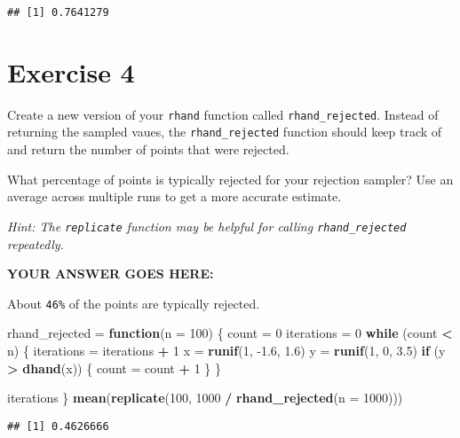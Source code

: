 \documentclass[
]{article}
\newenvironment{Shaded}{\begin{snugshade}}{\end{snugshade}}
\newcommand{\ControlFlowTok}[1]{\textcolor[rgb]{0.13,0.29,0.53}{\textbf{#1}}}
\newcommand{\DataTypeTok}[1]{\textcolor[rgb]{0.13,0.29,0.53}{#1}}
\newcommand{\DecValTok}[1]{\textcolor[rgb]{0.00,0.00,0.81}{#1}}
\newcommand{\FloatTok}[1]{\textcolor[rgb]{0.00,0.00,0.81}{#1}}
\newcommand{\KeywordTok}[1]{\textcolor[rgb]{0.13,0.29,0.53}{\textbf{#1}}}
\newcommand{\NormalTok}[1]{#1}
\newcommand{\OperatorTok}[1]{\textcolor[rgb]{0.81,0.36,0.00}{\textbf{#1}}}
\newcommand{\StringTok}[1]{\textcolor[rgb]{0.31,0.60,0.02}{#1}}
\begin{document}
\begin{verbatim}
## [1] 0.7641279
\end{verbatim}

\hypertarget{exercise-4}{%
\section{Exercise 4}\label{exercise-4}}

Create a new version of your \texttt{rhand} function called
\texttt{rhand\_rejected}. Instead of returning the sampled vaues, the
\texttt{rhand\_rejected} function should keep track of and return the
number of points that were rejected.

What percentage of points is typically rejected for your rejection
sampler? Use an average across multiple runs to get a more accurate
estimate.

\emph{Hint: The \texttt{replicate} function may be helpful for calling
\texttt{rhand\_rejected} repeatedly.}

\textbf{YOUR ANSWER GOES HERE:}

About \texttt{46\%} of the points are typically rejected.

\begin{Shaded}
\begin{Highlighting}[]
\NormalTok{rhand\_rejected =}\StringTok{ }\ControlFlowTok{function}\NormalTok{(}\DataTypeTok{n =} \DecValTok{100}\NormalTok{) \{}
\NormalTok{   count =}\StringTok{ }\DecValTok{0}
\NormalTok{   iterations =}\StringTok{ }\DecValTok{0}
   \ControlFlowTok{while}\NormalTok{ (count }\OperatorTok{\textless{}}\StringTok{ }\NormalTok{n) \{}
\NormalTok{      iterations =}\StringTok{ }\NormalTok{iterations }\OperatorTok{+}\StringTok{ }\DecValTok{1}
\NormalTok{      x =}\StringTok{ }\KeywordTok{runif}\NormalTok{(}\DecValTok{1}\NormalTok{, }\FloatTok{{-}1.6}\NormalTok{, }\FloatTok{1.6}\NormalTok{)}
\NormalTok{      y =}\StringTok{ }\KeywordTok{runif}\NormalTok{(}\DecValTok{1}\NormalTok{, }\DecValTok{0}\NormalTok{, }\FloatTok{3.5}\NormalTok{)}
      \ControlFlowTok{if}\NormalTok{ (y }\OperatorTok{\textgreater{}}\StringTok{ }\KeywordTok{dhand}\NormalTok{(x)) \{}
\NormalTok{         count =}\StringTok{ }\NormalTok{count }\OperatorTok{+}\StringTok{ }\DecValTok{1}
\NormalTok{      \}}
\NormalTok{   \}}

\NormalTok{   iterations}
\NormalTok{\}}
\KeywordTok{mean}\NormalTok{(}\KeywordTok{replicate}\NormalTok{(}\DecValTok{100}\NormalTok{, }\DecValTok{1000} \OperatorTok{/}\StringTok{ }\KeywordTok{rhand\_rejected}\NormalTok{(}\DataTypeTok{n =} \DecValTok{1000}\NormalTok{)))}
\end{Highlighting}
\end{Shaded}

\begin{verbatim}
## [1] 0.4626666
\end{verbatim}
\end{document}
